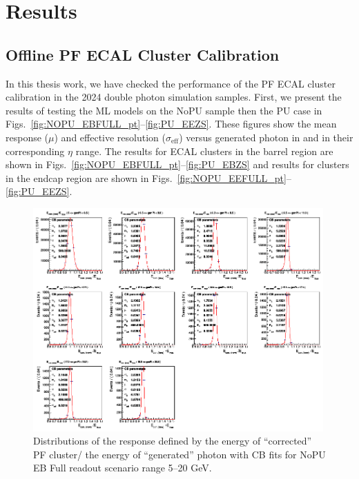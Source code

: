 \section{Results}

\subsection{Offline PF ECAL Cluster Calibration}

In this thesis work,
we have checked the performance of the PF ECAL cluster calibration in the 2024 double photon simulation samples.
First, we present the results of testing the ML models on the NoPU sample then the PU case in Figs.~\ref{fig:NOPU_EBFULL_pt}--\ref{fig:PU_EEZS}.
These figures show the mean response ($\mu$) and effective resolution ($\sigma_\mathrm{eff}$) versus generated photon \pt in \GeV and in their corresponding $\eta$ range.
The results for ECAL clusters in the barrel region are shown in Figs.~\ref{fig:NOPU_EBFULL_pt}--\ref{fig:PU_EBZS}
and results for clusters in the endcap region are shown in Figs.~\ref{fig:NOPU_EEFULL_pt}--\ref{fig:PU_EEZS}.

\begin{figure}[t!]
\centering
\includegraphics[width=0.99\textwidth]{./plots_pdf/ECAL_plots/plotsNoPU/EB/FULL/png/EBFULL_GENPT_0005_0020_PerBinFitEcor91formula}
\caption[Distributions of energy response with CB fits for PF ECAL cluster calibrated using the 2024 condition]{Distributions of the response defined by the energy of ``corrected'' PF cluster/ the energy of ``generated'' photon with CB fits for NoPU EB Full readout scenario \pt range  5--20 GeV.}
\label{fig:Response_distrubution}
\end{figure}

